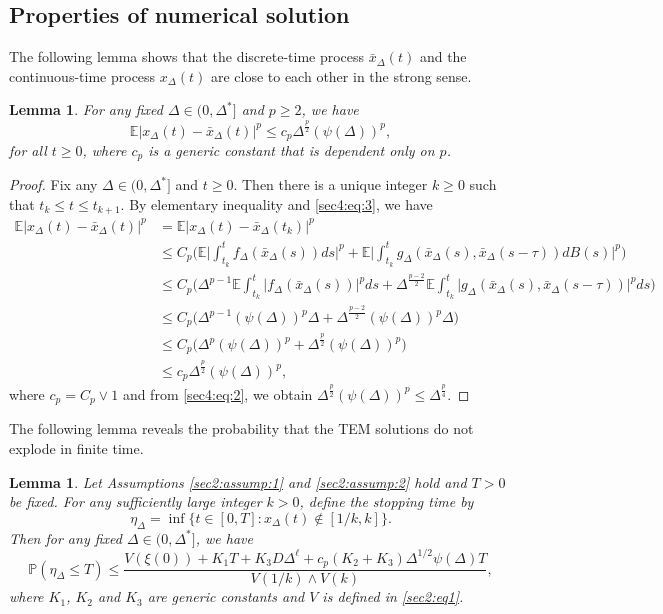 \documentclass[11pt]{article}
\newtheorem{lemma}[definition]{Lemma}
\begin{document}
\subsection{Properties of numerical solution}
The following lemma shows that the discrete-time process $\bar{x}_{\Delta}(t)$ and the continuous-time process $x_{\Delta}(t)$ are close to each other in the strong sense.
\begin{lemma}\label{sec5:eq:L1}
For any fixed $\Delta\in (0,\Delta^*]$ and $p\ge 2$, we have 
\begin{equation}
 \mathbb{E}\vert x_{\Delta}(t)-\bar{x}_{\Delta}(t)\vert^{p}\le c_p\Delta^{\frac{p}{2}}(\psi(\Delta))^p,
\end{equation}
for all $t\geq 0$, where $c_p$ is a generic constant that is dependent only on $p$.
\end{lemma}
\begin{proof}
Fix any $\Delta\in (0,\Delta^*]$ and $t\ge 0$. Then there is a unique integer $k\ge 0$ such that $t_k\le t\le t_{k+1}$. By elementary inequality and \eqref{sec4:eq:3}, we have
\begin{align*}
\mathbb{E}\vert x_{\Delta}(t)-\bar{x}_{\Delta}(t)\vert^p&=\mathbb{E}\vert x_{\Delta}(t)-\bar{x}_{\Delta}(t_k)\vert^p\\
&\le C_p\Big(\mathbb{E}\big\vert\int_{t_k}^tf_{\Delta}(\bar{x}_{\Delta}(s))ds\big\vert^p+\mathbb{E}\big\vert\int_{t_k}^tg_{\Delta}(\bar{x}_{\Delta}(s),\bar{x}_{\Delta}(s-\tau))dB(s)\big\vert^p\Big)\\
&\le C_p\Big(\Delta^{p-1}\mathbb{E}\int_{t_k}^t\vert f_{\Delta}(\bar{x}_{\Delta}(s))\vert^p ds+\Delta^{\frac{p-2}{2}}\mathbb{E}\int_{t_k}^t\vert g_{\Delta}(\bar{x}_{\Delta}(s),\bar{x}_{\Delta}(s-\tau))\vert^p ds\Big)\\
&\le C_p\Big(\Delta^{p-1}(\psi(\Delta))^p\Delta+\Delta^{\frac{p-2}{2}}(\psi(\Delta))^p\Delta\Big)\\
&\le C_p\Big(\Delta^{p}(\psi(\Delta))^p+\Delta^{\frac{p}{2}}(\psi(\Delta))^p\Big)\\
&\le c_p\Delta^{\frac{p}{2}}(\psi(\Delta))^p,
\end{align*}
where $c_p=C_p\vee 1$ and from \eqref{sec4:eq:2}, we obtain $\Delta^{\frac{p}{2}}(\psi(\Delta))^p\le \Delta^{\frac{p}{4}}$.
\end{proof}
The following lemma reveals the probability that the TEM solutions do not explode in finite time. 
\begin{lemma}\label{sub3}
Let Assumptions \ref{sec2:assump:1} and \ref{sec2:assump:2}  hold and $T>0$ be fixed. For any sufficiently large integer $k>0$, define the stopping time by
\begin{equation}\label{sec5:eq:tau}
\eta_{\Delta}=\inf\{t\in [0,T]:x_{\Delta}(t)\notin [1/k,k]\}.
\end{equation}
Then for any fixed $\Delta\in(0,\Delta^*]$, we have
\begin{equation}\label{probability2}
 \mathbb{P}(\eta_{\Delta}\leq T)\leq \frac{V(\xi(0))+K_1T+K_3D\Delta^{\ell}+c_p(K_2+K_3)\Delta^{1/2}\psi(\Delta)T}{V(1/k)\wedge V(k)},
\end{equation}
where  $K_1$, $K_2$ and $K_3$ are generic constants and $V$ is defined in \eqref{sec2:eq1}.
\end{lemma}
\end{document}
